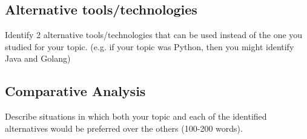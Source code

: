 \documentclass[a4paper, 11pt]{report}
\begin{document}
\subsection{Alternative tools/technologies}
Identify 2 alternative tools/technologies that can be used instead of the one you studied for your topic. (e.g. if your topic was Python, then you might identify Java and Golang)
\subsection{Comparative Analysis}
Describe situations in which both your topic and each of the identified alternatives would be preferred over the others (100-200 words).




\newpage



\end{document}
